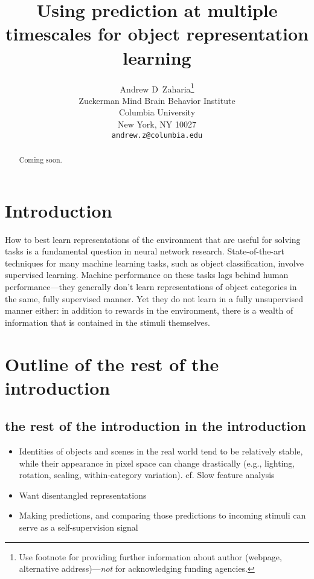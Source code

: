 \documentclass{article}
\title{Using prediction at multiple timescales for object representation learning}
\author{%
  Andrew D~Zaharia\thanks{Use footnote for providing further information
    about author (webpage, alternative address)---\emph{not} for acknowledging
    funding agencies.} \\
  Zuckerman Mind Brain Behavior Institute\\
  Columbia University\\
  New York, NY 10027 \\
  \texttt{andrew.z@columbia.edu} \\
}
\begin{document}

\maketitle

\begin{abstract}
  Coming soon.
\end{abstract}


\section{Introduction}

How to best learn representations of the environment that are useful for solving tasks is a fundamental question in neural network research. State-of-the-art techniques for many machine learning tasks, such as object classification, involve supervised learning. Machine performance on these tasks lags behind human performance---they generally don't learn representations of object categories in the same, fully supervised manner. Yet they do not learn in a fully unsupervised manner either: in addition to rewards in the environment, there is a wealth of information that is contained in the stimuli themselves.

\section*{Outline of the rest of the introduction}
\subsection*{the rest of the introduction in the introduction}
\begin{itemize}
  \item Identities of objects and scenes in the real world tend to be relatively stable, while their appearance in pixel space can change drastically (e.g., lighting, rotation, scaling, within-category variation). cf. Slow feature analysis \cite{Wiskott2002}
  \item Want disentangled representations \cite{DiCarlo2007,Bengio2009,Chen2016,Higgins2017,Alemi2017}
  \item Making predictions, and comparing those predictions to incoming stimuli can serve as a self-supervision signal \cite{Whitney2016,Doersch2015}
\end{itemize}
\end{document}
